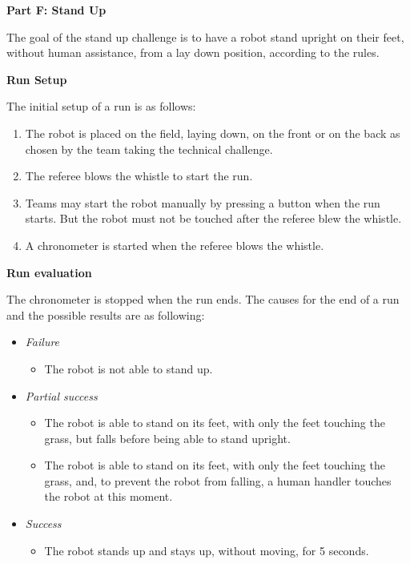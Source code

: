 \clearpage
\sffamily
{\bfseries \color[rgb]{0.4,0.4,0.4} Part F: Stand Up}
{}


\bigskip

The goal of the stand up challenge is to have a robot stand upright on their feet, without human assistance, from a lay down position, according to the rules.

\bigskip

{\bfseries Run Setup}

\smallskip

The initial setup of a run is as follows:

\begin{enumerate}

\item The robot is placed on the field, laying down, on the front or on the back as chosen by the team taking the technical challenge.

\item The referee blows the whistle to start the run.

\item Teams may start the robot manually by pressing a button when the run starts. But the robot must not be touched after the referee blew the whistle. 

\item A chronometer is started when the referee blows the whistle.
\end{enumerate}

{\bfseries Run evaluation}

\smallskip

The chronometer is stopped when the run ends. The causes for the end of a run and
the possible results are as following:
\begin{itemize}
\item \textit{Failure}
  \begin{itemize}
    \item The robot is not able to stand up.
     \end{itemize}
\item \textit{Partial success}
  \begin{itemize}
    \item The robot is able to stand on its feet, with only the feet touching the grass, but falls before being able to stand upright.
    \item The robot is able to stand on its feet, with only the feet touching the grass, and, to prevent the robot from falling, a human handler touches the robot at this moment.
  \end{itemize}
\item \textit{Success}
  \begin{itemize}
    \item The robot stands up and stays up, without moving, for 5 seconds.
  \end{itemize}
\end{itemize}

